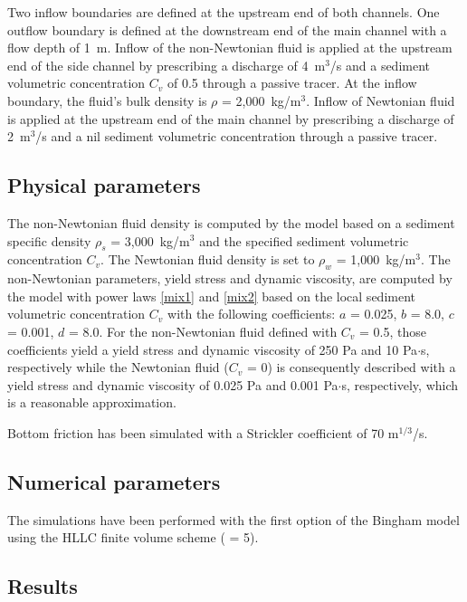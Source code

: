 Two inflow boundaries are defined at the upstream end of both channels.
One outflow boundary is defined at the downstream end of the main channel with a
flow depth of 1~m.
Inflow of the non-Newtonian fluid is applied at the upstream end of the side
channel by prescribing a discharge of 4~m$^3$/s and a sediment volumetric
concentration $C_v$ of 0.5 through a passive tracer.
At the inflow boundary, the fluid's bulk density is $\rho$ = 2,000~kg/m$^3$.
Inflow of Newtonian fluid is applied at the upstream end of the main channel by
prescribing a discharge of 2~m$^3$/s and a nil sediment volumetric concentration
through a passive tracer.

\subsection{Physical parameters}

The non-Newtonian fluid density is computed by the model based on a sediment
specific density $\rho_s$ = 3,000~kg/m$^3$ and the specified sediment volumetric
concentration $C_v$.
The Newtonian fluid density is set to $\rho_w$ = 1,000~kg/m$^3$.
The non-Newtonian parameters, yield stress and dynamic viscosity, are computed
by the model with power laws \eqref{mix1} and \eqref{mix2} based on the local
sediment volumetric concentration $C_v$ with the following coefficients:
$a$ = 0.025, $b$ = 8.0, $c$ = 0.001, $d$ = 8.0.
For the non-Newtonian fluid defined with $C_v$ = 0.5, those coefficients yield a
yield stress and dynamic viscosity of 250 Pa and 10 Pa$\cdot$s, respectively
while the Newtonian fluid ($C_v$ = 0) is consequently described with a yield
stress and dynamic viscosity of 0.025 Pa and 0.001 Pa$\cdot$s, respectively,
which is a reasonable approximation.

Bottom friction has been simulated with a Strickler coefficient of 70 m$^{1/3}$/s.

\subsection{Numerical parameters}

The simulations have been performed with the first option of the Bingham model
using the HLLC finite volume scheme ( = 5).

\subsection{Results}

